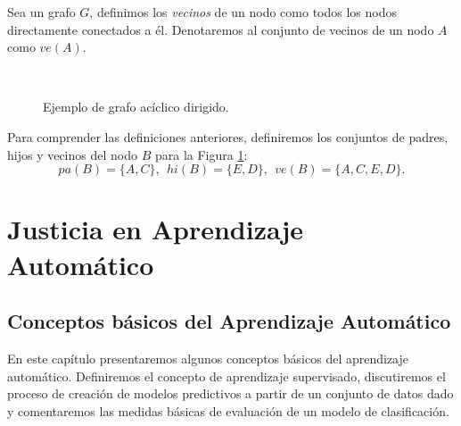 \documentclass[oneside,openright,titlepage,numbers=noenddot,openany,headinclude,footinclude=true,
cleardoublepage=empty,abstractoff,BCOR=5mm,paper=a4,fontsize=12pt,main=spanish]{scrreprt}
\begin{document}
\begin{definition}
Sea un grafo $G$, definimos los \textit{vecinos} de un nodo como todos los nodos directamente conectados a él. Denotaremos al conjunto de vecinos de un nodo $A$ como $ve(A)$.
\end{definition}\

\begin{figure}[h]
\centering
{}
\caption{Ejemplo de grafo acíclico dirigido.}
\label{fig:relations}
\end{figure}

\begin{example}
Para comprender las definiciones anteriores, definiremos los conjuntos de padres, hijos y vecinos del nodo $B$ para la Figura \ref{fig:relations}: $$pa(B)=\{A,C\}, \ \ hi(B)=\{E,D\}, \ \ ve(B)=\{A,C,E,D\}.$$
\end{example}

\part{Justicia en Aprendizaje Automático} \label{part:jusaa}


\chapter{Conceptos básicos del Aprendizaje Automático} \label{ch:conceptosaa}

En este capítulo presentaremos algunos conceptos básicos del aprendizaje automático. Definiremos el concepto de aprendizaje supervisado, discutiremos el proceso de creación de modelos predictivos a partir de un conjunto de datos dado y comentaremos las medidas básicas de evaluación de un modelo de clasificación.
\end{document}
